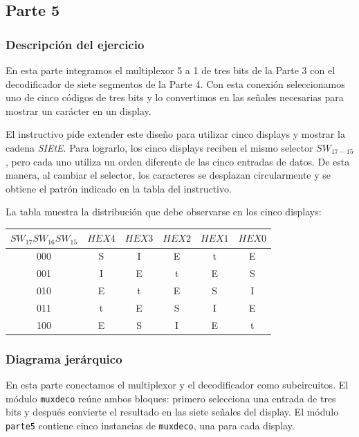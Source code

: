 \documentclass[12pt]{report}
\begin{document}
\subsection*{Parte 5}
\subsubsection*{Descripción del ejercicio}
En esta parte integramos el multiplexor 5 a 1 de tres bits de la Parte 3 con el decodificador de siete segmentos de la Parte 4. Con esta conexión seleccionamos uno de cinco códigos de tres bits y lo convertimos en las señales necesarias para mostrar un carácter en un display.

El instructivo pide extender este diseño para utilizar cinco displays y mostrar la cadena \textit{SIEtE}. Para lograrlo, los cinco displays reciben el mismo selector $SW_{17-15}$, pero cada uno utiliza un orden diferente de las cinco entradas de datos. De esta manera, al cambiar el selector, los caracteres se desplazan circularmente y se obtiene el patrón indicado en la tabla del instructivo.

La tabla muestra la distribución que debe observarse en los cinco displays:

\begin{center}
\begin{tabular}{|c|ccccc|}
\hline
$SW_{17}SW_{16}SW_{15}$ & $HEX4$ & $HEX3$ & $HEX2$ & $HEX1$ & $HEX0$ \\
\hline
000 & S & I & E & t & E \\
001 & I & E & t & E & S \\
010 & E & t & E & S & I \\
011 & t & E & S & I & E \\
100 & E & S & I & E & t \\
\hline
\end{tabular}
\end{center}

\subsubsection*{Diagrama jerárquico}
En esta parte conectamos el multiplexor y el decodificador como subcircuitos. El módulo \texttt{muxdeco} reúne ambos bloques: primero selecciona una entrada de tres bits y después convierte el resultado en las siete señales del display. El módulo \texttt{parte5} contiene cinco instancias de \texttt{muxdeco}, una para cada display.

\end{document}
